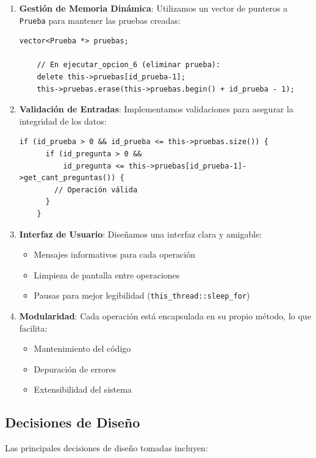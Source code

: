 \documentclass[12pt]{article}
\begin{document}
\begin{enumerate}
    \item \textbf{Gesti\'on de Memoria Din\'amica}: Utilizamos un vector de punteros a \texttt{Prueba} para mantener las pruebas creadas:
    \begin{lstlisting}[style=customc]
    vector<Prueba *> pruebas;
    
    // En ejecutar_opcion_6 (eliminar prueba):
    delete this->pruebas[id_prueba-1];
    this->pruebas.erase(this->pruebas.begin() + id_prueba - 1);
    \end{lstlisting}

    \item \textbf{Validaci\'on de Entradas}: Implementamos validaciones para asegurar la integridad de los datos:
    \begin{lstlisting}[style=customc]
    if (id_prueba > 0 && id_prueba <= this->pruebas.size()) {
      if (id_pregunta > 0 && 
          id_pregunta <= this->pruebas[id_prueba-1]->get_cant_preguntas()) {
        // Operación válida
      }
    }
    \end{lstlisting}

    \item \textbf{Interfaz de Usuario}: Dise\~namos una interfaz clara y amigable:
    \begin{itemize}
        \item Mensajes informativos para cada operaci\'on
        \item Limpieza de pantalla entre operaciones
        \item Pausas para mejor legibilidad (\texttt{this\_thread::sleep\_for})
    \end{itemize}

    \item \textbf{Modularidad}: Cada operaci\'on est\'a encapsulada en su propio m\'etodo, lo que facilita:
    \begin{itemize}
        \item Mantenimiento del c\'odigo
        \item Depuraci\'on de errores
        \item Extensibilidad del sistema
    \end{itemize}
\end{enumerate}

\subsection{Decisiones de Dise\~no}
Las principales decisiones de dise\~no tomadas incluyen:
\end{document}
